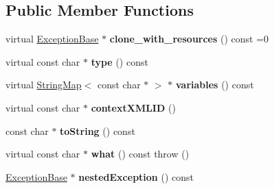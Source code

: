 \subsection*{\-Public \-Member \-Functions}
\begin{DoxyCompactItemize}
\item 
\hypertarget{classgeneral__server_1_1ExceptionBase_acea12600a93bc94f5d0789b1dc17e2f7}{virtual \hyperlink{classgeneral__server_1_1ExceptionBase}{\-Exception\-Base} $\ast$ {\bfseries clone\-\_\-with\-\_\-resources} () const =0}\label{classgeneral__server_1_1ExceptionBase_acea12600a93bc94f5d0789b1dc17e2f7}

\item 
\hypertarget{classgeneral__server_1_1ExceptionBase_a9809e78cfc96a08c27d683aaebeba5b4}{virtual const char $\ast$ {\bfseries type} () const }\label{classgeneral__server_1_1ExceptionBase_a9809e78cfc96a08c27d683aaebeba5b4}

\item 
\hypertarget{classgeneral__server_1_1ExceptionBase_a1260b54c591de111a206c6139492da2a}{virtual \hyperlink{classgeneral__server_1_1StringMap}{\-String\-Map}$<$ const char $\ast$ $>$ $\ast$ {\bfseries variables} () const }\label{classgeneral__server_1_1ExceptionBase_a1260b54c591de111a206c6139492da2a}

\item 
\hypertarget{classgeneral__server_1_1ExceptionBase_a6d805801cec0b1abfec9cc76e7902e7d}{virtual const char $\ast$ {\bfseries context\-X\-M\-L\-I\-D} ()}\label{classgeneral__server_1_1ExceptionBase_a6d805801cec0b1abfec9cc76e7902e7d}

\item 
\hypertarget{classgeneral__server_1_1ExceptionBase_a353d5732b24946dd6b54f01b3ce2af4a}{const char $\ast$ {\bfseries to\-String} () const }\label{classgeneral__server_1_1ExceptionBase_a353d5732b24946dd6b54f01b3ce2af4a}

\item 
\hypertarget{classgeneral__server_1_1ExceptionBase_a87a3b78556dd3eb35d5457b7c2eceb13}{virtual const char $\ast$ {\bfseries what} () const   throw ()}\label{classgeneral__server_1_1ExceptionBase_a87a3b78556dd3eb35d5457b7c2eceb13}

\item 
\hypertarget{classgeneral__server_1_1ExceptionBase_abed7e254f45b324e3abeb37b76f59dd2}{\hyperlink{classgeneral__server_1_1ExceptionBase}{\-Exception\-Base} $\ast$ {\bfseries nested\-Exception} () const }\label{classgeneral__server_1_1ExceptionBase_abed7e254f45b324e3abeb37b76f59dd2}

\end{DoxyCompactItemize}
